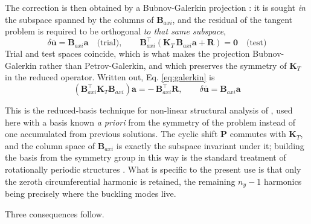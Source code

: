 \documentclass[11pt,a4paper]{article}
\begin{document}
The correction is then obtained by a Bubnov-Galerkin projection
\citep{fletcher1984}: it is sought \emph{in} the subspace spanned by the
columns of $\boldsymbol{B}_{axi}$, and the residual of the tangent problem is
required to be orthogonal \emph{to that same subspace},
\begin{equation}\label{eq:galerkin}
	\delta\boldsymbol{\bar{u}} = \boldsymbol{B}_{axi}\boldsymbol{a}
	\quad\text{(trial)},
	\qquad
	\boldsymbol{B}_{axi}^\top\left(\boldsymbol{K}_T\,
	\boldsymbol{B}_{axi}\boldsymbol{a} + \boldsymbol{R}\right)
	= \boldsymbol{0}
	\quad\text{(test)}
\end{equation}
Trial and test spaces coincide, which is what makes the projection
Bubnov-Galerkin rather than Petrov-Galerkin, and which preserves the symmetry
of $\boldsymbol{K}_T$ in the reduced operator.  Written out, Eq.
\ref{eq:galerkin} is
\begin{equation}\label{eq:reduced-newton}
	\left( \boldsymbol{B}_{axi}^\top \boldsymbol{K}_T \boldsymbol{B}_{axi}
	\right) \boldsymbol{a}
	= -\,\boldsymbol{B}_{axi}^\top \boldsymbol{R},
	\qquad
	\delta\boldsymbol{\bar{u}} = \boldsymbol{B}_{axi}\boldsymbol{a}
\end{equation}

This is the reduced-basis technique for non-linear structural analysis of
\citet{noor1980}, used here with a basis known \emph{a priori} from the
symmetry of the problem instead of one accumulated from previous solutions.
The cyclic shift $\boldsymbol{P}$ commutes with $\boldsymbol{K}_T$, and the
column space of $\boldsymbol{B}_{axi}$ is exactly the subspace invariant
under it; building the basis from the symmetry group in this way is the
standard treatment of rotationally periodic structures \citep{thomas1979}.
What is specific to the present use is that only the zeroth circumferential
harmonic is retained, the remaining $n_y - 1$ harmonics being precisely where
the buckling modes live.

Three consequences follow.
\end{document}
